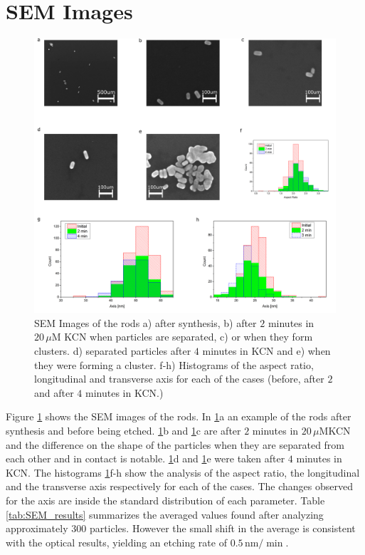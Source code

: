 \documentclass[a4paper,oneside,onecolumn]{article}
\newcommand{\uM}{\ensuremath{\,\mu\textrm{M}}}
\begin{document}
\section{SEM Images}

\begin{figure}[tp]
 \centering
 \includegraphics[width=0.95\linewidth]{Figures/04_Supporting/02_SEM/sem.png}
 \caption{SEM Images of the rods a) after synthesis, b) after $2$ minutes in
 $20\uM$ KCN when particles are separated, c) or when they form clusters. d)
 separated particles after $4$ minutes in KCN and e) when they were forming a
 cluster. f-h) Histograms of the aspect ratio, longitudinal and transverse axis
 for each of the cases (before, after $2$ and after $4$ minutes in KCN.) }
 \label{fig:SEM}
\end{figure}

Figure \ref{fig:SEM} shows the SEM images of the rods. In \ref{fig:SEM}a an
example of the rods after synthesis and before being etched. \ref{fig:SEM}b and
\ref{fig:SEM}c are after $2$ minutes in $20\uM$KCN and the difference on the
shape of the particles when they are separated from each other and in contact is
notable. \ref{fig:SEM}d and \ref{fig:SEM}e were taken after $4$ minutes in KCN.
The histograms \ref{fig:SEM}f-h show the analysis of the aspect ratio, the
longitudinal and the transverse axis respectively for each of the  cases. The
changes observed for the axis are inside the standard distribution of each
parameter. Table \ref{tab:SEM_results} summarizes the averaged values found
after analyzing approximately $300$ particles. However the small shift in the
average is consistent with the optical results, yielding an etching rate of
$0.5\,\textrm{nm}/\min$.
\end{document}
